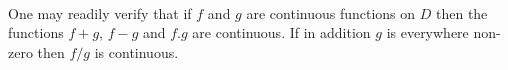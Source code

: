         \paragraph{}
One may readily verify that if $f$ and $g$ are continuous
functions on $D$ then the functions $f+g$, $f-g$ and
$f.g$ are continuous. If in addition $g$ is everywhere
non-zero then $f/g$ is continuous.
%
    \clearpage
%
%
%
%
%
%
    \clearpage
%
%
    \clearpage
%
%
%
%
%
%
%
    \clearpage
%

